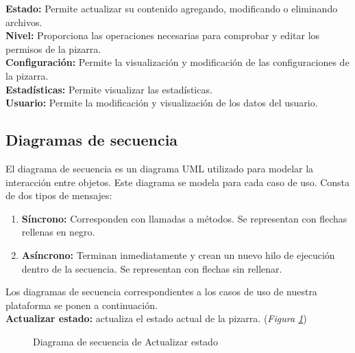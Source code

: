 \textbf{Estado:} Permite actualizar su contenido agregando, modificando o eliminando archivos.\\

\textbf{Nivel: }Proporciona las operaciones necesarias para comprobar y editar los permisos de la pizarra.\\

\textbf{Configuración: }Permite la visualización y modificación de las configuraciones de la pizarra.\\

\textbf{Estadísticas: }Permite visualizar las estadísticas.\\

\textbf{Usuario:} Permite la modificación y visualización de los datos del usuario.

\begin{sidewaysfigure}
\centering
\clases
\caption{Diagrama de clases}
\label{diagramadeclases2}
\end{sidewaysfigure}
\newpage

\subsection{Diagramas de secuencia}

El diagrama de secuencia es un diagrama UML utilizado para modelar la interacción entre objetos. Este diagrama se modela para cada caso de uso. Consta de dos tipos de mensajes:
\begin{enumerate}
	\item \textbf{Síncrono: }Corresponden con llamadas a métodos. Se representan con flechas rellenas en negro.
	\item \textbf{Asíncrono: }Terminan inmediatamente y crean un nuevo hilo de ejecución dentro de la secuencia. Se representan con flechas sin rellenar.
\end{enumerate}

Los diagramas de secuencia correspondientes a los casos de uso de nuestra plataforma se ponen a continuación.\\


\textbf{Actualizar estado:} actualiza el estado actual de la pizarra. (\emph{Figura \ref{fig:seqActualizarEstado}}) 

\begin{figure}[H]
\centering
\seqActualizarEstado
\caption{Diagrama de secuencia de Actualizar estado}
\label{fig:seqActualizarEstado}
\end{figure}


